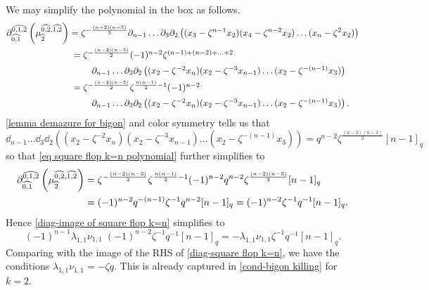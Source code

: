 We may simplify the polynomial in the box as follows.
\begin{align}\label{eq square flop k=n polynomial}
\notag \ddm{0,1,2}{0,1}\left(\mu^{\hh{0,2},\hh{1,2}}_{\hh{2}} \right) &= \zeta^{-\frac{(n-2)(n-3)}{2}}\dd_{n-1}\ldots \dd_3 \dd_2\left((x_3-\zeta^{n-1}x_2)(x_4- \zeta^{n-2}x_2)\ldots (x_n-\zeta^2x_2)\right)\\
\notag
    &\begin{array}{l}=\zeta^{-\frac{(n-2)(n-3)}{2}}(-1)^{n-2} \zeta^{(n-1)+      (n-2)+\ldots +2}\vspace{5 pt}\\
    \quad \quad\dd_{n-1}\ldots \dd_3\dd_2 \left((x_2-\zeta^{-2}x_n)(x_2-\zeta^{-3}x_{n-1})\ldots(x_2-\zeta^{-(n-1)}x_3)  \right)\end{array}\\
    &\begin{array}{l}=\zeta^{-\frac{(n-2)(n-3)}{2}}\zeta^{\frac{n(n-1)}{2}-1}(-1)^{n-2}\vspace{5 pt}\\
    \quad \quad\dd_{n-1}\ldots \dd_3\dd_2 \left((x_2-\zeta^{-2}x_n)(x_2-\zeta^{-3}x_{n-1})\ldots(x_2-\zeta^{-(n-1)}x_3)  \right).\end{array}
\end{align}
\cref{lemma demazure for bigon} and color symmetry tells us that 
$$\dd_{n-1}\ldots \dd_3\dd_2 \left((x_2-\zeta^{-2}x_n)(x_2-\zeta^{-3}x_{n-1})\ldots(x_2-\zeta^{-(n-1)}x_3)  \right)=q^{n-2}\zeta^{\frac{(n-2)(n-3)}{2}}[n-1]_q$$
so that \cref{eq square flop k=n polynomial} further simplifies to
\begin{align*}
   \partial^{\widehat{0,1,2}}_{\widehat{0,1}}\left(\mu^{\widehat{0,2},\widehat{1,2}}_{\widehat{2}} \right)  
   &= \zeta^{-\frac{(n-2)(n-3)}{2}}\zeta^{\frac{n(n-1)}{2}-1}(-1)^{n-2}q^{n-2}\zeta^{\frac{(n-2)(n-3)}{2}}[n-1]_q\\
   &=(-1)^{n-2}q^{-(n-1)}\zeta^{-1}q^{n-2}[n-1]_q =(-1)^{n-2}\zeta^{-1}q^{-1}[n-1]_q.
\end{align*}
Hence \cref{diag-image of square flop k=n} simplifies to
\[(-1)^{n-1} \lambda_{1,1}\nu_{1,1}\;(-1)^{n-2}\zeta^{-1}q^{-1}[n-1]_q=-\lambda_{1,1}\nu_{1,1}\zeta^{-1}q^{-1}[n-1]_q.\]
Comparing with the image of the RHS of \cref{diag-square flop k=n}, we have the conditions $\lambda_{1,1}\nu_{1,1}=-\zeta q.$
This is already captured in \cref{cond-bigon killing} for $k=2$.
